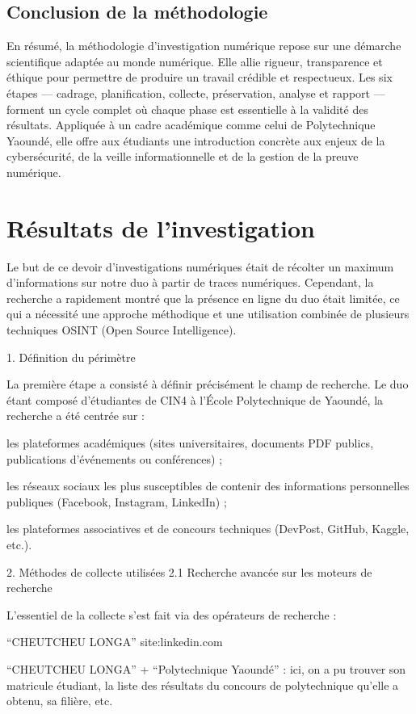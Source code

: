 \documentclass[12pt,a4paper]{report}
\begin{document}
	\subsection{Conclusion de la méthodologie}
	En résumé, la méthodologie d’investigation numérique repose sur une démarche scientifique adaptée au monde numérique. 
	Elle allie rigueur, transparence et éthique pour permettre de produire un travail crédible et respectueux. 
	Les six étapes — cadrage, planification, collecte, préservation, analyse et rapport — forment un cycle complet où chaque phase est essentielle à la validité des résultats. 
	Appliquée à un cadre académique comme celui de Polytechnique Yaoundé, elle offre aux étudiants une introduction concrète aux enjeux de la cybersécurité, de la veille informationnelle et de la gestion de la preuve numérique.
	

	\section{Résultats de l'investigation}
	
	Le but de ce devoir d'investigations numériques était de récolter un maximum d'informations sur notre duo à partir de traces numériques. Cependant, la recherche a rapidement montré que la présence en ligne du duo était limitée, ce qui a nécessité une approche méthodique et une utilisation combinée de plusieurs techniques OSINT (Open Source Intelligence).
	
	1. Définition du périmètre
	
	La première étape a consisté à définir précisément le champ de recherche.
	Le duo étant composé d’étudiantes de CIN4 à l’École Polytechnique de Yaoundé, la recherche a été centrée sur :
	
	les plateformes académiques (sites universitaires, documents PDF publics, publications d’événements ou conférences) ;
	
	les réseaux sociaux les plus susceptibles de contenir des informations personnelles publiques (Facebook, Instagram, LinkedIn) ;
	
	les plateformes associatives et de concours techniques (DevPost, GitHub, Kaggle, etc.).
	
2. Méthodes de collecte utilisées
2.1 Recherche avancée sur les moteurs de recherche

L’essentiel de la collecte s’est fait via des opérateurs de recherche :

“CHEUTCHEU LONGA” site:linkedin.com

“CHEUTCHEU LONGA” + “Polytechnique Yaoundé” : ici, on a pu trouver son matricule étudiant, la liste des résultats du concours de polytechnique qu'elle a obtenu, sa filière, etc.
\end{document}
